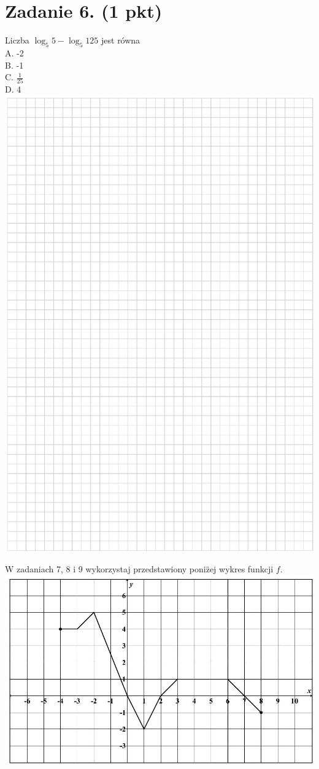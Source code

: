 \documentclass[10pt]{article}
\begin{document}
\section*{Zadanie 6. (1 pkt)}
Liczba \(\log _{5} 5-\log _{5} 125\) jest równa\\
A. -2\\
B. -1\\
C. \(\frac{1}{25}\)\\
D. 4\\
\includegraphics[max width=\textwidth, center]{2024_11_21_603d5c1b2a7d8d68f45fg-03}

W zadaniach 7, 8 i 9 wykorzystaj przedstawiony poniz̈ej wykres funkcji \(f\).\\
\includegraphics[max width=\textwidth, center]{2024_11_21_603d5c1b2a7d8d68f45fg-04(4)}
\end{document}
